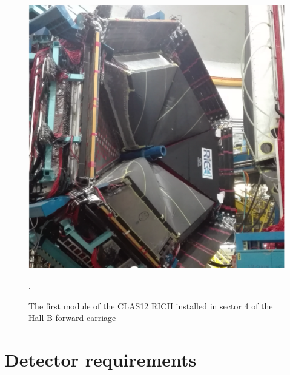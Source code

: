 \documentclass[5p,times,twocolumn]{elsarticle}
\begin{document}
\begin{figure}[t]
\begin{center}
\includegraphics[width=0.80\columnwidth]{RICH_Installed.pdf}
\end{center}
\caption{The first module of the CLAS12 RICH installed in sector 4 of the Hall-B forward carriage}.
\label{Fig:RICHPic}
\end{figure}



\section{Detector requirements}
\end{document}
